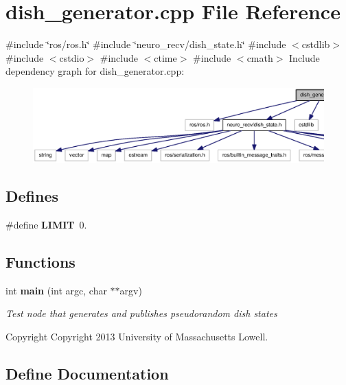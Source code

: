 \section{dish\-\_\-generator.\-cpp \-File \-Reference}
\label{dish__generator_8cpp}
{\ttfamily \#include \char`\"{}ros/ros.\-h\char`\"{}}\*
{\ttfamily \#include \char`\"{}neuro\-\_\-recv/dish\-\_\-state.\-h\char`\"{}}\*
{\ttfamily \#include $<$cstdlib$>$}\*
{\ttfamily \#include $<$cstdio$>$}\*
{\ttfamily \#include $<$ctime$>$}\*
{\ttfamily \#include $<$cmath$>$}\*
\-Include dependency graph for dish\-\_\-generator.\-cpp\-:\nopagebreak
\begin{figure}[H]
\begin{center}
\leavevmode
\includegraphics[width=350pt]{dish__generator_8cpp__incl}
\end{center}
\end{figure}
\subsection*{\-Defines}
\begin{DoxyCompactItemize}
\item 
\#define {\bf \-L\-I\-M\-I\-T}~0.
\end{DoxyCompactItemize}
\subsection*{\-Functions}
\begin{DoxyCompactItemize}
\item 
int {\bf main} (int argc, char $\ast$$\ast$argv)
\begin{DoxyCompactList}\small\item\em \-Test node that generates and publishes pseudorandom dish states \begin{DoxyCopyright}{\-Copyright}
\-Copyright 2013 \-University of \-Massachusetts \-Lowell. 
\end{DoxyCopyright}
\end{DoxyCompactList}\end{DoxyCompactItemize}


\subsection{\-Define \-Documentation}
